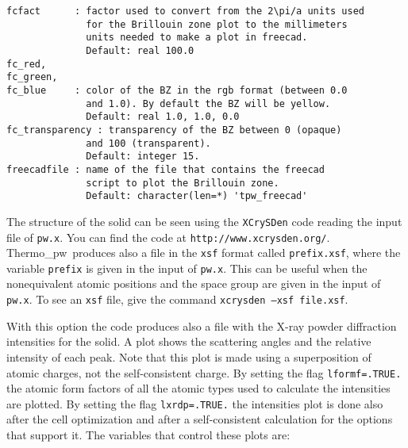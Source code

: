 \documentclass[12pt,a4paper,twoside]{report}
\def\thermo{{\sc Thermo}\_{\sc pw}}
\begin{document}
\begin{verbatim}
fcfact      : factor used to convert from the 2\pi/a units used 
              for the Brillouin zone plot to the millimeters 
              units needed to make a plot in freecad. 
              Default: real 100.0
fc_red,     
fc_green,
fc_blue     : color of the BZ in the rgb format (between 0.0 
              and 1.0). By default the BZ will be yellow.
              Default: real 1.0, 1.0, 0.0
fc_transparency : transparency of the BZ between 0 (opaque) 
              and 100 (transparent).
              Default: integer 15.
freecadfile : name of the file that contains the freecad 
              script to plot the Brillouin zone.
              Default: character(len=*) 'tpw_freecad'
\end{verbatim}

The structure of the solid can be seen using the \texttt{XCrySDen} code
reading the input file of \texttt{pw.x}. You can find the code at
\texttt{http://www.xcrysden.org/}. \thermo\ produces also a file in the
\texttt{xsf} format called \texttt{prefix.xsf}, where the variable 
\texttt{prefix}
is given in the input of \texttt{pw.x}. This can be useful when
the nonequivalent atomic positions and the space group are given in the input
of \texttt{pw.x}. To see an \texttt{xsf} file, give the command
\texttt{xcrysden --xsf file.xsf}.

With this option the code produces also a file with the X-ray
powder diffraction intensities for the solid. A plot shows the 
scattering angles and the relative intensity of each peak. Note 
that this plot is made using 
a superposition of atomic charges, not the self-consistent charge.
By setting the flag \texttt{lformf=.TRUE.} the atomic form factors of all 
the atomic types used to calculate the intensities are plotted. 
By setting the flag \texttt{lxrdp=.TRUE.} the intensities plot is done also 
after the cell optimization and after a self-consistent calculation 
for the options that support it.
The variables that control these plots are:
\end{document}
